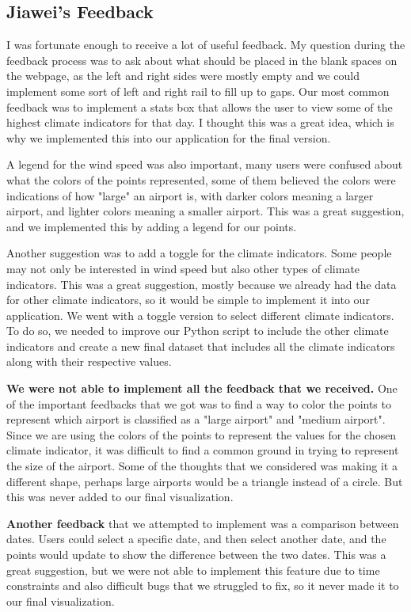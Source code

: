 \documentclass[10pt,twocolumn,twoside]{opticajnl}
\begin{document}
\subsection{Jiawei's Feedback}
I was fortunate enough to receive a lot of useful feedback. My question during the feedback process was to ask about what should be placed in the blank spaces on the webpage, as the left and right sides were mostly empty and we could implement some sort of left and right rail to fill up to gaps. Our most common feedback was to implement a stats box that allows the user to view some of the highest climate indicators for that day. I thought this was a great idea, which is why we implemented this into our application for the final version.

A legend for the wind speed was also important, many users were confused about what the colors of the points represented, some of them believed the colors were indications of how "large" an airport is, with darker colors meaning a larger airport, and lighter colors meaning a smaller airport. This was a great suggestion, and we implemented this by adding a legend for our points.

Another suggestion was to add a toggle for the climate indicators. Some people may not only be interested in wind speed but also other types of climate indicators. This was a great suggestion, mostly because we already had the data for other climate indicators, so it would be simple to implement it into our application. We went with a toggle version to select different climate indicators. To do so, we needed to improve our Python script to include the other climate indicators and create a new final dataset that includes all the climate indicators along with their respective values. 

\textbf{We were not able to implement all the feedback that we received.} One of the important feedbacks that we got was to find a way to color the points to represent which airport is classified as a "large airport" and "medium airport". Since we are using the colors of the points to represent the values for the chosen climate indicator, it was difficult to find a common ground in trying to represent the size of the airport. Some of the thoughts that we considered was making it a different shape, perhaps large airports would be a triangle instead of a circle. But this was never added to our final visualization.

\textbf{Another feedback} that we attempted to implement was a comparison between dates. Users could select a specific date, and then select another date, and the points would update to show the difference between the two dates. This was a great suggestion, but we were not able to implement this feature due to time constraints and also difficult bugs that we struggled to fix, so it never made it to our final visualization.
\end{document}
